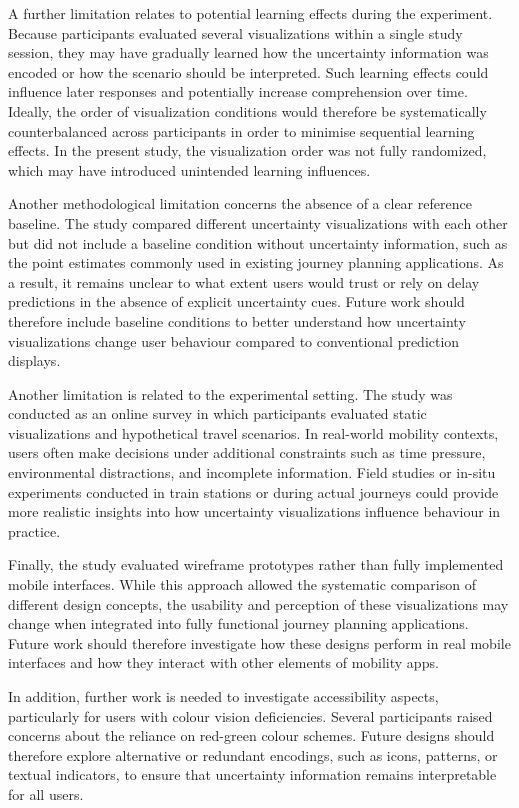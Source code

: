 \documentclass[final,journal,a4paper]{IEEEtran}
\begin{document}
A further limitation relates to potential learning effects during the experiment. Because participants evaluated several visualizations within a single study session, they may have gradually learned how the uncertainty information was encoded or how the scenario should be interpreted. Such learning effects could influence later responses and potentially increase comprehension over time. Ideally, the order of visualization conditions would therefore be systematically counterbalanced across participants in order to minimise sequential learning effects. In the present study, the visualization order was not fully randomized, which may have introduced unintended learning influences.

Another methodological limitation concerns the absence of a clear reference baseline. The study compared different uncertainty visualizations with each other but did not include a baseline condition without uncertainty information, such as the point estimates commonly used in existing journey planning applications. As a result, it remains unclear to what extent users would trust or rely on delay predictions in the absence of explicit uncertainty cues. Future work should therefore include baseline conditions to better understand how uncertainty visualizations change user behaviour compared to conventional prediction displays.

Another limitation is related to the experimental setting. The study was conducted as an online survey in which participants evaluated static visualizations and hypothetical travel scenarios. In real-world mobility contexts, users often make decisions under additional constraints such as time pressure, environmental distractions, and incomplete information. Field studies or in-situ experiments conducted in train stations or during actual journeys could provide more realistic insights into how uncertainty visualizations influence behaviour in practice.

Finally, the study evaluated wireframe prototypes rather than fully implemented mobile interfaces. While this approach allowed the systematic comparison of different design concepts, the usability and perception of these visualizations may change when integrated into fully functional journey planning applications. Future work should therefore investigate how these designs perform in real mobile interfaces and how they interact with other elements of mobility apps.

In addition, further work is needed to investigate accessibility aspects, particularly for users with colour vision deficiencies. Several participants raised concerns about the reliance on red-green colour schemes. Future designs should therefore explore alternative or redundant encodings, such as icons, patterns, or textual indicators, to ensure that uncertainty information remains interpretable for all users.
\end{document}
